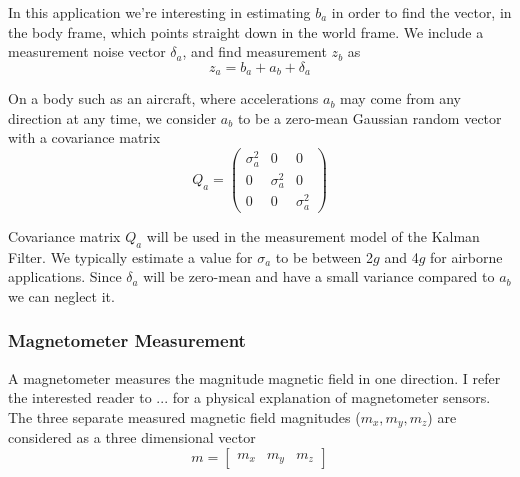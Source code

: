 \documentclass[12pt]{report}
\begin{document}
In this application we're interesting in estimating $b_a$ in order to find the vector, in the body frame, which points straight down in the world frame. We include a measurement noise vector $\delta_a$, and find measurement $z_b$ as
\begin{equation} \label{eq:findgb}
  z_a = b_a + a_b + \delta_a
\end{equation}

On a body such as an aircraft, where accelerations $a_b$ may come from any direction at any time, we consider $a_b$ to be a zero-mean Gaussian random vector with a covariance matrix 
\begin{equation} \label{eq:Qa}
  Q_a = \begin{pmatrix} \sigma_a^2 & 0 & 0 \\
	                      0 & \sigma_a^2 & 0 \\ 
	                      0 & 0 & \sigma_a^2 \end{pmatrix} 
\end{equation}

Covariance matrix $Q_a$ will be used in the measurement model of the Kalman Filter. We typically estimate a value for $\sigma_a$ to be between 2$g$ and 4$g$ for airborne applications. Since $\delta_a$ will be zero-mean and have a small variance compared to $a_b$ we can neglect it.

\subsubsection{Magnetometer Measurement}

A magnetometer measures the magnitude magnetic field in one direction. I refer the interested reader to ... for a physical explanation of magnetometer sensors. The three separate measured magnetic field magnitudes ($m_x, m_y, m_z$) are considered as a three dimensional vector
\begin{equation} \label{eq:defb}
  m = \begin{bmatrix} m_x & m_y & m_z \end{bmatrix}
\end{equation}
\end{document}
